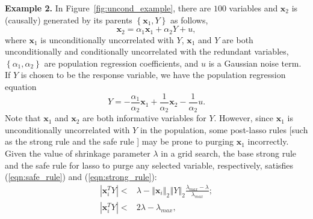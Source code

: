 \documentclass[11pt,authoryear]{elsarticle}
\begin{document}
\smallskip
\noindent
\textbf{Example 2.} In Figure~\ref{fig:uncond_example}, there are $100$ variables and $\mathbf{x}_2$ is (causally) generated by its parents $\left\{ \mathbf{x}_1, Y \right\}$ as follows,
%
\begin{equation}
  \mathbf{x}_2 = \alpha_1 \mathbf{x}_1 + \alpha_2 Y + u,
  \label{eqn:collider_1}
\end{equation}
%
where $\mathbf{x}_1$ is unconditionally uncorrelated with $Y$, $\mathbf{x}_1$ and $Y$ are both unconditionally and conditionally uncorrelated with the redundant variables, $\left\{\alpha_1, \alpha_2 \right\}$ are population regression coefficients, and $u$ is a Gaussian noise term. If $Y$ is chosen to be the response variable, we have the population regression equation
%
\begin{equation}
  Y = -\frac{\alpha_1}{\alpha_2} \mathbf{x}_1 + \frac{1}{\alpha_2} \mathbf{x}_2 - \frac{1}{\alpha_2}u.
  \label{eqn:collider_2}
\end{equation}
%
Note that $\mathbf{x}_1$ and $\mathbf{x}_2$ are both informative variables for $Y$. However, since $\mathbf{x}_1$ is unconditionally uncorrelated with $Y$ in the population, some post-lasso rules [such as the strong rule \citep{tibshirani2012strong} and the safe rule \citep{ghaoui2010safe}] may be prone to purging $\mathbf{x}_1$ incorrectly. Given the value of shrinkage parameter $\lambda$ in a grid search, the base strong rule and the safe rule for lasso to purge any selected variable, respectively, satisfies (\ref{eqn:safe_rule}) and (\ref{eqn:strong_rule}):
%
\begin{eqnarray}
  \left\vert \mathbf{x}_i^T Y \right\vert < & \lambda - \left\Vert \mathbf{x}_i \right\Vert_2 \left\Vert Y \right\Vert_2 \frac{\lambda_{max} - \lambda} {\lambda_{max}} ; \label{eqn:safe_rule} \\
  \left\vert \mathbf{x}_i^T Y \right\vert < & 2\lambda - \lambda_{max} , \label{eqn:strong_rule}
  \label{eqn:post_estmation_rule}
\end{eqnarray}
%
\end{document}
